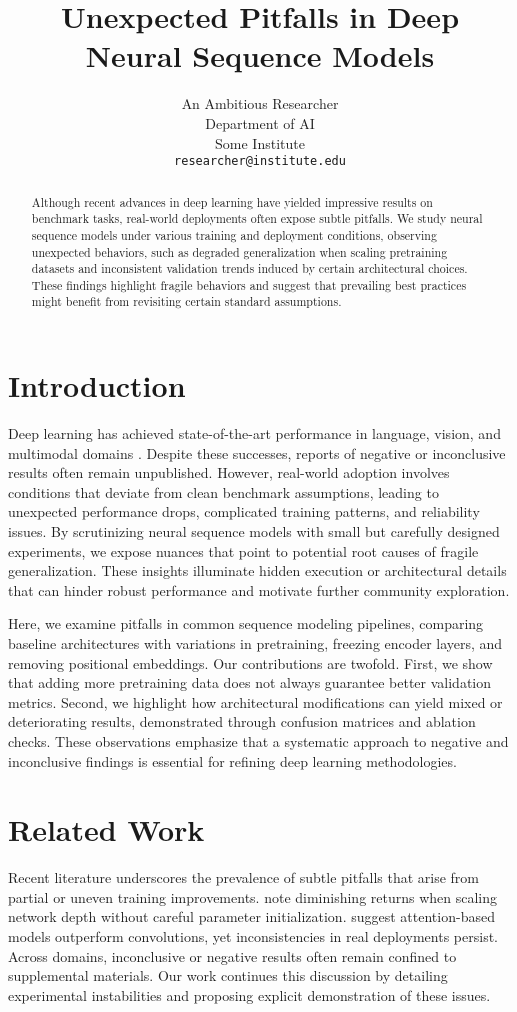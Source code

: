 \documentclass[11pt]{article}
\title{\bf Unexpected Pitfalls in Deep Neural Sequence Models}
\author{
    An Ambitious Researcher \\
    Department of AI \\
    Some Institute \\
    \texttt{researcher@institute.edu}
}
\date{}
\begin{document}
\maketitle

\begin{abstract}
Although recent advances in deep learning have yielded impressive results on benchmark tasks, real-world deployments often expose subtle pitfalls. We study neural sequence models under various training and deployment conditions, observing unexpected behaviors, such as degraded generalization when scaling pretraining datasets and inconsistent validation trends induced by certain architectural choices. These findings highlight fragile behaviors and suggest that prevailing best practices might benefit from revisiting certain standard assumptions.
\end{abstract}

\section{Introduction}
Deep learning has achieved state-of-the-art performance in language, vision, and multimodal domains \citep{lecun2015}. Despite these successes, reports of negative or inconclusive results often remain unpublished. However, real-world adoption involves conditions that deviate from clean benchmark assumptions, leading to unexpected performance drops, complicated training patterns, and reliability issues. By scrutinizing neural sequence models with small but carefully designed experiments, we expose nuances that point to potential root causes of fragile generalization. These insights illuminate hidden execution or architectural details that can hinder robust performance and motivate further community exploration.

Here, we examine pitfalls in common sequence modeling pipelines, comparing baseline architectures with variations in pretraining, freezing encoder layers, and removing positional embeddings. Our contributions are twofold. First, we show that adding more pretraining data does not always guarantee better validation metrics. Second, we highlight how architectural modifications can yield mixed or deteriorating results, demonstrated through confusion matrices and ablation checks. These observations emphasize that a systematic approach to negative and inconclusive findings is essential for refining deep learning methodologies.

\section{Related Work}
Recent literature underscores the prevalence of subtle pitfalls that arise from partial or uneven training improvements. \citet{simonyan2015} note diminishing returns when scaling network depth without careful parameter initialization. \citet{vaswani2017} suggest attention-based models outperform convolutions, yet inconsistencies in real deployments persist. Across domains, inconclusive or negative results often remain confined to supplemental materials. Our work continues this discussion by detailing experimental instabilities and proposing explicit demonstration of these issues.
\end{document}
